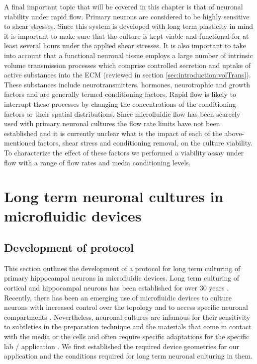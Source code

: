 A final important topic that will be covered in this chapter is that of neuronal viability under rapid flow. Primary neurons are considered to be highly sensitive to shear stresses. Since this system is developed with long term plasticity in mind it is important to make sure that the culture is kept viable and functional for at least several hours under the applied shear stresses. It is also important to take into account that a functional neuronal tissue employs a large number of intrinsic volume transmission processes which comprise controlled secretion and uptake of active substances into the ECM (reviewed in section \ref{sec:introduction:volTrans}). These substances include neurotransmitters, hormones, neurotrophic and growth factors and are generally termed conditioning factors. Rapid flow is likely to interrupt these processes by changing the concentrations of the conditioning factors or their spatial distributions. Since microfluidic flow has been scarcely used with primary neuronal cultures the flow rate limits have not been established and it is currently unclear what is the impact of each of the above-mentioned factors, shear stress and conditioning removal, on the culture viability. To characterize the effect of these factors we performed a viability assay under flow with a range of flow rates and media conditioning levels.

\section{Long term neuronal cultures in microfluidic devices}
    \subsection{Development of protocol}
    \label{sec:devices:protocolDev}

    This section outlines the development of a protocol for long term culturing of primary hippocampal neurons in microfluidic devices. Long term culturing of cortical and hippocampal neurons has been established for over 30 years \cite{brewer1993optimized,romijn1984towards,ray1993proliferation}. Recently, there has been an emerging use of microfluidic devices to culture neurons with increased control over the topology and to access specific neuronal compartments \cite{park2006microfluidic,park2013advances,gross2007applications}. Nevertheless, neuronal cultures are infamous for their sensitivity to subtleties in the preparation technique and the materials that come in contact with the media or the cells and often require specific adaptations for the specific lab / application \cite{kaech2006culturing,millet2007microfluidic}. We first established the required device geometries for our application and the conditions required for long term neuronal culturing in them.

